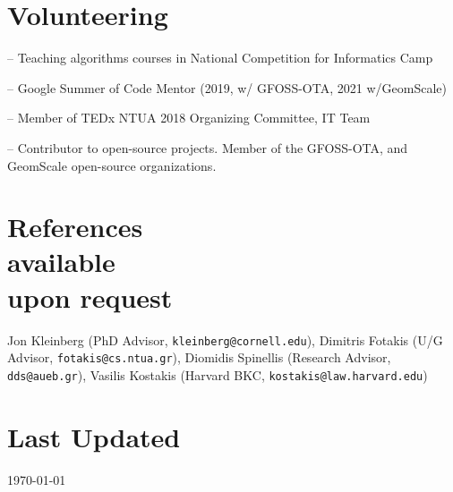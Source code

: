 \documentclass[margin, 10pt]{res}
\begin{document}
\begin{resume}
\begin{compactitem}
\end{compactitem}


\section{Volunteering} 
\begin{compactitem}
    \item[--] Teaching algorithms courses in National Competition for Informatics Camp 
    \item[--] Google Summer of Code Mentor (2019, w/ GFOSS-OTA, 2021 w/GeomScale)
    \item[--] Member of TEDx NTUA 2018 Organizing Committee, IT Team 
    \item[--] Contributor to open-source projects. Member of the GFOSS-OTA, and GeomScale open-source organizations.

\end{compactitem}

\section{References \\ available \\ upon request}

Jon Kleinberg (PhD Advisor, \texttt{kleinberg@cornell.edu}), 
Dimitris Fotakis  (U/G Advisor, \texttt{fotakis@cs.ntua.gr}),
Diomidis Spinellis  (Research Advisor, \texttt{dds@aueb.gr}), 
Vasilis Kostakis  (Harvard BKC, \texttt{kostakis@law.harvard.edu}) 


\section{Last Updated} \today

\begin{comment}

\section{Selected \\ Projects \& Published \\ Software} 


\end{comment}
\end{resume}
\end{document}
